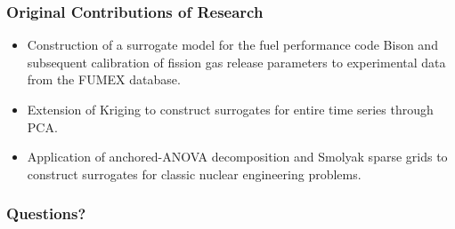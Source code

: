 \begin{frame}
\frametitle{Original Contributions of Research}

\begin{itemize}
  \item Construction of a surrogate model for the fuel performance code Bison and subsequent calibration of fission gas release parameters to experimental data from the FUMEX database. 
  \item Extension of Kriging to construct surrogates for entire time series through PCA. 
  \item Application of anchored-ANOVA decomposition and Smolyak sparse grids to construct surrogates for classic nuclear engineering problems.
\end{itemize}

\end{frame}
\begin{frame}
\frametitle{Questions?}

\end{frame}














